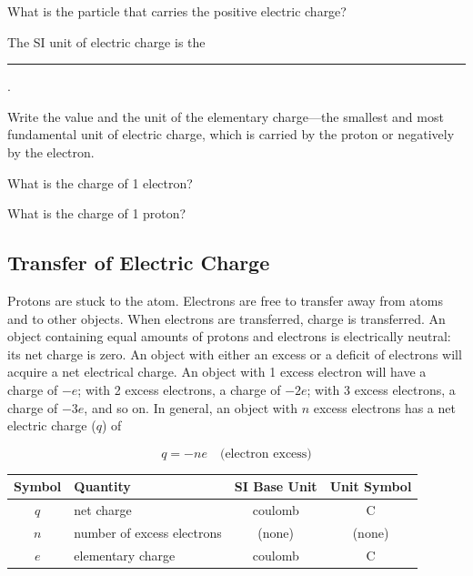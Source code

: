 \documentclass[dvipsnames]{article}
\numberwithin{equation}{section}
\numberwithin{figure}{section}
\begin{document}
\begin{exercise}
    What is the particle that carries the positive electric charge?
\end{exercise}

\begin{exercise}
    The SI unit of electric charge is the \rule{2cm}{0.15mm}.
\end{exercise}

\begin{exercise}
    Write the value and the unit of the \gls{elementary charge}---the smallest and most fundamental unit of electric charge, which is carried by the proton or negatively by the electron.
\end{exercise}

\begin{exercise}
    What is the charge of 1 electron?
\end{exercise}

\begin{exercise}
    What is the charge of 1 proton?
\end{exercise}

\cyanhrule

\subsection{Transfer of Electric Charge} \label{XFJNUr}

Protons are stuck to the atom. Electrons are free to transfer away from atoms and to other objects. When electrons are transferred, charge is transferred. An object containing equal amounts of protons and electrons is electrically neutral: its net charge is zero. An object with either an excess or a deficit of electrons will acquire a net electrical charge. An object with 1 excess electron will have a charge of $-e$; with 2 excess electrons, a charge of $-2e$; with 3 excess electrons, a charge of $-3e$, and so on. In general, an object with $n$ excess electrons has a net electric charge ($q$) of

\begin{equation} \label{Dabfyz}
    q = - ne \hspace{1em} \text{(electron excess)}
\end{equation}

\begin{center}
    \begin{tabular}{cl|cc}
    \hline
    \textbf{Symbol} & \textbf{Quantity} & \textbf{SI Base Unit} & \textbf{Unit Symbol}  \\
    \hline\hline
    \rule{0pt}{2.5ex}
        $q$ & net charge & coulomb & \si{\coulomb}\\
        $n$ & number of excess electrons & (none) & (none) \\
        $e$ & elementary charge & coulomb & \si{\coulomb} \\
    \hline
    \end{tabular}
\end{center}
\end{document}
